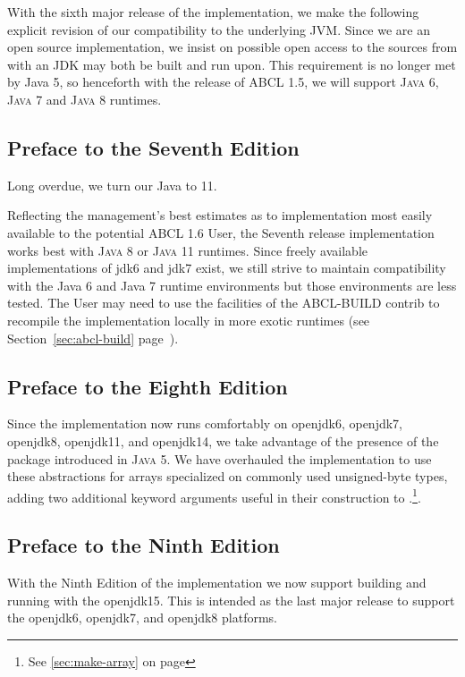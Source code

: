 \documentclass[10pt]{book}
\begin{document}
With the sixth major release of the implementation, we make the
following explicit revision of our compatibility to the underlying
\textsc{JVM}.  Since we are an open source implementation, we insist
on possible open access to the sources from with an \textsc{JDK} may
both be built and run upon.  This requirement is no longer met by Java
5, so henceforth with the release of \textsc{ABCL} 1.5, we will
support \textsc{Java 6}, \textsc{Java 7} and \textsc{Java 8} runtimes.

\subsection{Preface to the Seventh Edition}

Long overdue, we turn our Java to 11.

Reflecting the management's best estimates as to implementation most
easily available to the potential \textsc{ABCL} 1.6 User, the Seventh
release implementation works best with \textsc{Java 8} or \textsc{Java 11}
runtimes.  Since freely available implementations of jdk6 and jdk7
exist, we still strive to maintain compatibility with the Java 6 and
Java 7 runtime environments but those environments are less tested.
The User may need to use the facilities of the \textsc{ABCL-BUILD} contrib to
recompile the implementation locally in more exotic runtimes (see
Section~\ref{sec:abcl-build} page~\pageref{sec:abcl-build}).


\subsection{Preface to the Eighth Edition}
Since the implementation now runs comfortably on openjdk6, openjdk7,
openjdk8, openjdk11, and openjdk14, we take advantage of the presence
of the  package introduced in \textsc{Java 5}.  We have
overhauled the implementation to use these abstractions for arrays
specialized on commonly used unsigned-byte types, adding two
additional keyword arguments useful in their construction to
.\footnote{See \ref{sec:make-array} on page
\pageref{sec:make-array}}.

\subsection{Preface to the Ninth Edition}
With the Ninth Edition of the implementation we now support building
and running with the openjdk15.  This is intended as the last major
release to support the openjdk6, openjdk7, and openjdk8 platforms.
\end{document}
